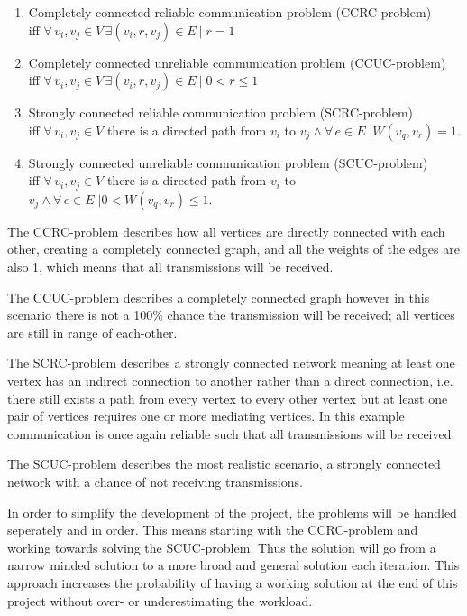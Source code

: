 \begin{enumerate}[label=\itshape \arabic*\upshape)]
    \item Completely connected reliable communication problem (CCRC-problem) \\   
    iff $\forall\, v_i, v_j \in V \, \exists (v_i,r,v_j)\in E\ | \; r = 1$
    \item Completely connected unreliable communication problem (CCUC-problem) \\
    iff $\forall\, v_i, v_j \in V \, \exists (v_i,r,v_j)\in E\ | \; 0 < r \leq 1$
    \item Strongly connected reliable communication problem (SCRC-problem) \\  
    iff $\forall\, v_i, v_j \in V $ there is a directed path from $v_i$ to $v_j \land \forall\, e \in E\; | W(v_q, v_r) = 1$.    
    \item Strongly connected unreliable communication problem (SCUC-problem) \\
    iff $\forall\, v_i, v_j \in V $ there is a directed path from $v_i$ to $v_j \land \forall\, e \in E\; | 0 < W(v_q, v_r) \leq 1$.
\end{enumerate}
\bigskip \noindent
The CCRC-problem describes how all vertices are directly connected with each other, creating a completely connected graph, and all the weights of the edges are also 1, which means that all transmissions will be received.

\bigskip \noindent
The CCUC-problem describes a completely connected graph however in this scenario there is not a 100\% chance the transmission will be received; all vertices are still in range of each-other.

\bigskip \noindent
The SCRC-problem describes a strongly connected network meaning at least one vertex has an indirect connection to another rather than a direct connection, i.e. there still exists a path from every vertex to every other vertex but at least one pair of vertices requires one or more mediating vertices. In this example communication is once again reliable such that all transmissions will be received.

\bigskip \noindent
The SCUC-problem describes the most realistic scenario, a strongly connected network with a chance of not receiving transmissions.

\bigskip \noindent
In order to simplify the development of the project, the problems will be handled seperately and in order.
This means starting with the CCRC-problem and working towards solving the SCUC-problem.
Thus the solution will go from a narrow minded solution to a more broad and general solution each iteration.
This approach increases the probability of having a working solution at the end of this project without over- or underestimating the workload.